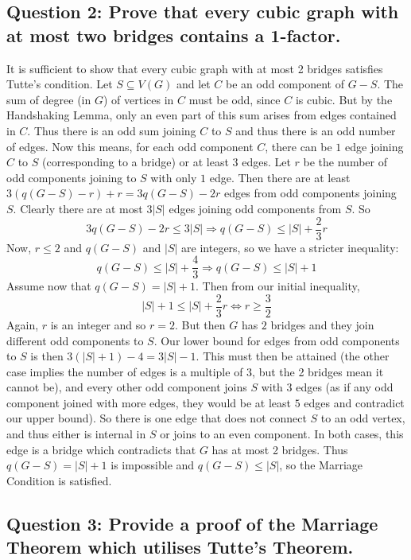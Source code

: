 \documentclass[letterpaper, 11pt]{article}
\newcommand{\1}{\mathds{1}}	%
\theoremstyle{definition}
\begin{document}
\subsection*{Question 2: Prove that every cubic graph with at most two bridges contains a 1-factor.}
It is sufficient to show that every cubic graph with at most 2 bridges satisfies Tutte's condition. Let $S \subseteq V(G)$ and let $C$ be an odd component of $G - S$. The sum of degree (in $G$) of vertices in $C$ must be odd, since $C$ is cubic. But by the Handshaking Lemma, only an even part of this sum arises from edges contained in $C$. Thus there is an odd sum joining $C$ to $S$ and thus there is an odd number of edges. Now this means, for each odd component $C$, there can be $1$ edge joining $C$ to $S$ (corresponding to a bridge) or at least $3$ edges. Let $r$ be the number of odd components joining to $S$ with only $1$ edge. Then there are at least $3(q(G-S) - r) + r = 3q(G - S) - 2r$ edges from odd components joining $S$. Clearly there are at most $3|S|$ edges joining odd components from $S$. So \[
3q(G - S) - 2r \le 3|S| \Longrightarrow q(G - S) \le |S| + \frac{2}{3}r
\]
Now, $r \le 2$ and $q(G - S)$ and $|S|$ are integers, so we have a stricter inequality:
\[
q(G - S) \le |S| + \frac{4}{3} \Longrightarrow q(G - S) \le |S| + 1
\]
Assume now that $q(G - S) = |S| + 1$. Then from our initial inequality, \[
|S| + 1 \le |S| + \frac{2}{3}r \iff r \ge \frac{3}{2}
\]
Again, $r$ is an integer and so $r = 2$. But then $G$ has $2$ bridges and they join different odd components to $S$. Our lower bound for edges from odd components to $S$ is then $3(|S| + 1) - 4 = 3 |S|-1$. This must then be attained (the other case implies the number of edges is a multiple of 3, but the 2 bridges mean it cannot be), and every other odd component joins $S$ with $3$ edges (as if any odd component joined with more edges, they would be at least $5$ edges and contradict our upper bound). So there is one edge that does not connect $S$ to an odd vertex, and thus either is internal in $S$ or joins to an even component. In both cases, this edge is a bridge which contradicts that $G$ has at most 2 bridges. Thus $q(G - S) = |S| + 1$ is impossible and $q(G - S) \le |S|$, so the Marriage Condition is satisfied.

\subsection*{Question 3: Provide a proof of the Marriage Theorem which utilises Tutte's Theorem.}
\end{document}

